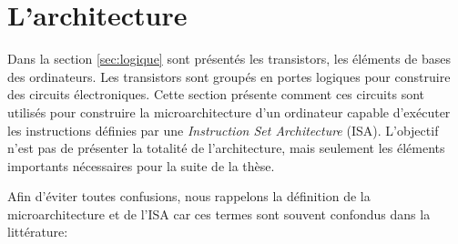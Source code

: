 \section{L'architecture} \label{sec:micro}

Dans la section \autoref{sec:logique} sont présentés les transistors, les éléments de bases des ordinateurs. Les transistors sont groupés en portes logiques pour construire des circuits électroniques. Cette section présente comment ces circuits sont utilisés pour construire la microarchitecture d'un ordinateur capable d'exécuter les instructions définies par une \textit{Instruction Set Architecture} (ISA). L'objectif n'est pas de présenter la totalité de l'architecture, mais seulement les éléments importants nécessaires pour la suite de la thèse.

Afin d'éviter toutes confusions, nous rappelons la définition de la microarchitecture et de l'ISA car ces termes sont souvent confondus dans la littérature:

